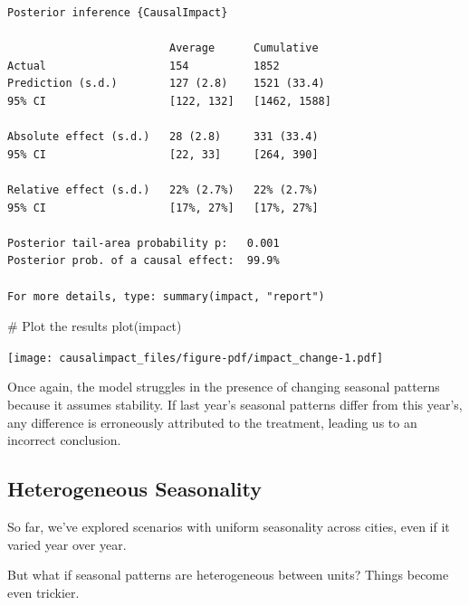 \documentclass[
  letterpaper,
  DIV=11,
  numbers=noendperiod]{scrreprt}
\newenvironment{Shaded}{\begin{snugshade}}{\end{snugshade}}
\newcommand{\CommentTok}[1]{\textcolor[rgb]{0.37,0.37,0.37}{#1}}
\newcommand{\FunctionTok}[1]{\textcolor[rgb]{0.28,0.35,0.67}{#1}}
\newcommand{\NormalTok}[1]{\textcolor[rgb]{0.00,0.23,0.31}{#1}}
\begin{document}
\begin{verbatim}
Posterior inference {CausalImpact}

                         Average      Cumulative  
Actual                   154          1852        
Prediction (s.d.)        127 (2.8)    1521 (33.4) 
95% CI                   [122, 132]   [1462, 1588]
                                                  
Absolute effect (s.d.)   28 (2.8)     331 (33.4)  
95% CI                   [22, 33]     [264, 390]  
                                                  
Relative effect (s.d.)   22% (2.7%)   22% (2.7%)  
95% CI                   [17%, 27%]   [17%, 27%]  

Posterior tail-area probability p:   0.001
Posterior prob. of a causal effect:  99.9%

For more details, type: summary(impact, "report")
\end{verbatim}

\begin{Shaded}
\begin{Highlighting}[]
\CommentTok{\# Plot the results}
\FunctionTok{plot}\NormalTok{(impact)}
\end{Highlighting}
\end{Shaded}

\texttt{[image: causalimpact\_files/figure-pdf/impact\_change-1.pdf]}

Once again, the model struggles in the presence of changing seasonal
patterns because it assumes stability. If last year's seasonal patterns
differ from this year's, any difference is erroneously attributed to the
treatment, leading us to an incorrect conclusion.

\subsection{Heterogeneous Seasonality}\label{heterogeneous-seasonality}

So far, we've explored scenarios with uniform seasonality across cities,
even if it varied year over year.

But what if seasonal patterns are heterogeneous between units? Things
become even trickier.
\end{document}
